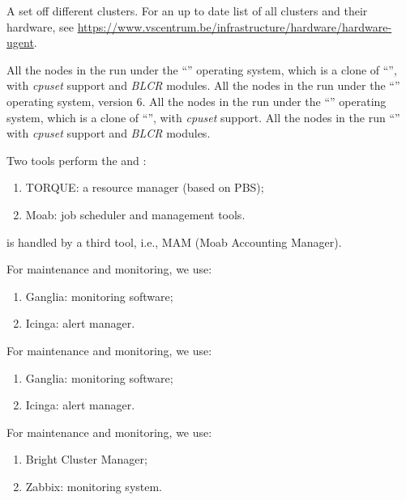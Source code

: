 \fi
\ifgent
  A set off different clusters. For an up to date list of all clusters and their hardware, see \url{https://www.vscentrum.be/infrastructure/hardware/hardware-ugent}.
\fi

\ifantwerpen
All the nodes in the \hpc run under the ``\operatingsystemSL'' operating
system, which is a clone of ``\operatingsystemRHEL'',
with \emph{cpuset} support and \emph{BLCR} modules.
\fi
\ifleuven
All the nodes in the \hpc run under the ``\operatingsystem'' operating system,
version 6.
\fi
\ifbrussel
All the nodes in the \hpc run under the ``\operatingsystemSL'' operating
system, which is a clone of ``\operatingsystemRHEL'',
with \emph{cpuset} support.
\fi
\ifgent
All the nodes in the \hpc run ``\operatingsystem''
with \emph{cpuset} support and \emph{BLCR} modules.
\fi

Two tools perform the  and :
\begin{enumerate}
  \item  TORQUE: a resource manager (based on PBS);
  \item  Moab: job scheduler and management tools.
\end{enumerate}
\ifantwerpen
\fi
\ifleuven
{} is handled by a third tool, i.e., MAM (Moab Accounting
Manager).
\fi

\ifantwerpen
    For maintenance and monitoring, we use:
    \begin{enumerate}
      \item  Ganglia: monitoring software;
      \item  Icinga: alert manager.
    \end{enumerate}
\fi
\ifleuven
    For maintenance and monitoring, we use:
    \begin{enumerate}
      \item  Ganglia: monitoring software;
      \item  Icinga: alert manager.
    \end{enumerate}
\fi
\ifbrussel
    For maintenance and monitoring, we use:
    \begin{enumerate}
      \item  Bright Cluster Manager;
      \item  Zabbix: monitoring system.
    \end{enumerate}
\fi


